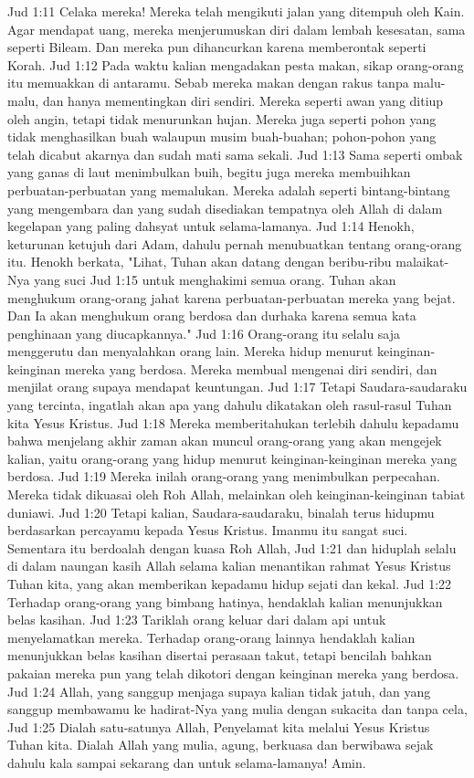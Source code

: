 Jud 1:11  Celaka mereka! Mereka telah mengikuti jalan yang ditempuh oleh Kain. Agar mendapat uang, mereka menjerumuskan diri dalam lembah kesesatan, sama seperti Bileam. Dan mereka pun dihancurkan karena memberontak seperti Korah.
Jud 1:12  Pada waktu kalian mengadakan pesta makan, sikap orang-orang itu memuakkan di antaramu. Sebab mereka makan dengan rakus tanpa malu-malu, dan hanya mementingkan diri sendiri. Mereka seperti awan yang ditiup oleh angin, tetapi tidak menurunkan hujan. Mereka juga seperti pohon yang tidak menghasilkan buah walaupun musim buah-buahan; pohon-pohon yang telah dicabut akarnya dan sudah mati sama sekali.
Jud 1:13  Sama seperti ombak yang ganas di laut menimbulkan buih, begitu juga mereka membuihkan perbuatan-perbuatan yang memalukan. Mereka adalah seperti bintang-bintang yang mengembara dan yang sudah disediakan tempatnya oleh Allah di dalam kegelapan yang paling dahsyat untuk selama-lamanya.
Jud 1:14  Henokh, keturunan ketujuh dari Adam, dahulu pernah menubuatkan tentang orang-orang itu. Henokh berkata, "Lihat, Tuhan akan datang dengan beribu-ribu malaikat-Nya yang suci
Jud 1:15  untuk menghakimi semua orang. Tuhan akan menghukum orang-orang jahat karena perbuatan-perbuatan mereka yang bejat. Dan Ia akan menghukum orang berdosa dan durhaka karena semua kata penghinaan yang diucapkannya."
Jud 1:16  Orang-orang itu selalu saja menggerutu dan menyalahkan orang lain. Mereka hidup menurut keinginan-keinginan mereka yang berdosa. Mereka membual mengenai diri sendiri, dan menjilat orang supaya mendapat keuntungan.
Jud 1:17  Tetapi Saudara-saudaraku yang tercinta, ingatlah akan apa yang dahulu dikatakan oleh rasul-rasul Tuhan kita Yesus Kristus.
Jud 1:18  Mereka memberitahukan terlebih dahulu kepadamu bahwa menjelang akhir zaman akan muncul orang-orang yang akan mengejek kalian, yaitu orang-orang yang hidup menurut keinginan-keinginan mereka yang berdosa.
Jud 1:19  Mereka inilah orang-orang yang menimbulkan perpecahan. Mereka tidak dikuasai oleh Roh Allah, melainkan oleh keinginan-keinginan tabiat duniawi.
Jud 1:20  Tetapi kalian, Saudara-saudaraku, binalah terus hidupmu berdasarkan percayamu kepada Yesus Kristus. Imanmu itu sangat suci. Sementara itu berdoalah dengan kuasa Roh Allah,
Jud 1:21  dan hiduplah selalu di dalam naungan kasih Allah selama kalian menantikan rahmat Yesus Kristus Tuhan kita, yang akan memberikan kepadamu hidup sejati dan kekal.
Jud 1:22  Terhadap orang-orang yang bimbang hatinya, hendaklah kalian menunjukkan belas kasihan.
Jud 1:23  Tariklah orang keluar dari dalam api untuk menyelamatkan mereka. Terhadap orang-orang lainnya hendaklah kalian menunjukkan belas kasihan disertai perasaan takut, tetapi bencilah bahkan pakaian mereka pun yang telah dikotori dengan keinginan mereka yang berdosa.
Jud 1:24  Allah, yang sanggup menjaga supaya kalian tidak jatuh, dan yang sanggup membawamu ke hadirat-Nya yang mulia dengan sukacita dan tanpa cela,
Jud 1:25  Dialah satu-satunya Allah, Penyelamat kita melalui Yesus Kristus Tuhan kita. Dialah Allah yang mulia, agung, berkuasa dan berwibawa sejak dahulu kala sampai sekarang dan untuk selama-lamanya! Amin.


